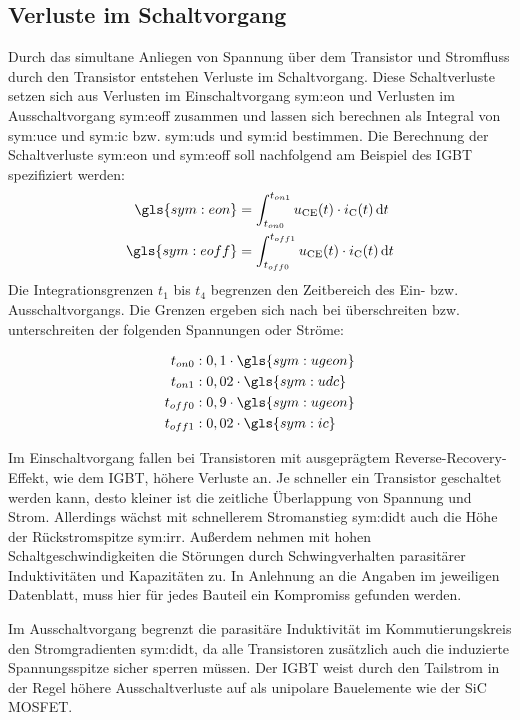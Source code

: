 \subsection{Verluste im Schaltvorgang} \label{sec:schaltverluste}

Durch das simultane Anliegen von Spannung über dem Transistor und Stromfluss durch den Transistor entstehen Verluste im Schaltvorgang. 
Diese Schaltverluste setzen sich aus Verlusten im Einschaltvorgang \gls{sym:eon} und Verlusten im Ausschaltvorgang \gls{sym:eoff} zusammen
und lassen sich berechnen als Integral von \gls{sym:uce} und \gls{sym:ic} bzw. \gls{sym:uds} und \gls{sym:id} bestimmen. 
Die Berechnung der Schaltverluste \gls{sym:eon} und \gls{sym:eoff} soll nachfolgend am Beispiel des \gls{IGBT} spezifiziert werden: 
\begin{align}
 \gls{sym:eon} &= \int_{t_{on0}}^{t_{on1}} u_{\mathrm{CE}}(t) \cdot i_\mathrm{C}(t) \,\mathrm{d}t \\
 \gls{sym:eoff} &= \int_{t_{off0}}^{t_{off1}} u_{\mathrm{CE}}(t) \cdot i_\mathrm{C}(t) \,\mathrm{d}t 
\end{align}
Die Integrationsgrenzen $ t_{1} $ bis $ t_{4} $ begrenzen den Zeitbereich des Ein- bzw. Ausschaltvorgangs. Die Grenzen ergeben sich nach \cite{Semikronswloss} bei überschreiten bzw. unterschreiten der folgenden Spannungen oder Ströme:

\begin{align}
	t_{on0} &: 0,1 \cdot \gls{sym:ugeon}  \\
	t_{on1} &: 0,02 \cdot \gls{sym:udc}  \\
	t_{off0} &: 0,9 \cdot \gls{sym:ugeon} \\
	t_{off1} &: 0,02 \cdot \gls{sym:ic}
\end{align}

Im Einschaltvorgang fallen bei Transistoren mit ausgeprägtem Reverse-Recovery-Effekt, wie dem \gls{IGBT}, höhere Verluste an. 
Je schneller ein Transistor geschaltet werden kann, desto kleiner ist die zeitliche Überlappung von Spannung und Strom. Allerdings wächst mit schnellerem Stromanstieg \gls{sym:didt} auch die Höhe der Rückstromspitze \gls{sym:irr}. Außerdem nehmen mit hohen Schaltgeschwindigkeiten die Störungen durch Schwingverhalten parasitärer Induktivitäten und Kapazitäten zu. In Anlehnung an die Angaben im jeweiligen Datenblatt, muss hier für jedes Bauteil ein Kompromiss gefunden werden.

Im Ausschaltvorgang begrenzt die parasitäre Induktivität im Kommutierungskreis den Stromgradienten \gls{sym:didt}, da alle Transistoren zusätzlich auch die induzierte Spannungsspitze sicher sperren müssen. Der \gls{IGBT} weist durch den Tailstrom in der Regel höhere Ausschaltverluste auf als unipolare Bauelemente wie der \gls{SiC} \gls{MOSFET}.
